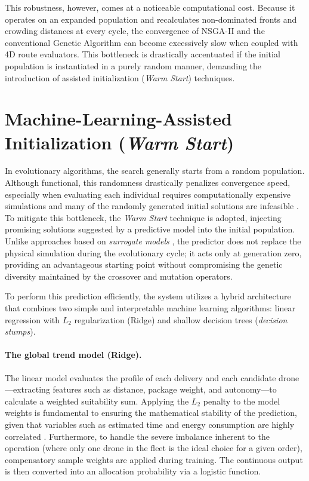 This robustness, however, comes at a noticeable computational cost. Because it operates on an expanded population and recalculates non-dominated fronts and crowding distances at every cycle, the convergence of NSGA-II and the conventional Genetic Algorithm can become excessively slow when coupled with 4D route evaluators. This bottleneck is drastically accentuated if the initial population is instantiated in a purely random manner, demanding the introduction of assisted initialization (\textit{Warm Start}) techniques.

\section{Machine-Learning-Assisted Initialization (\textit{Warm Start})}\label{sec:warmstart}

In evolutionary algorithms, the search generally starts from a random population. Although functional, this randomness drastically penalizes convergence speed, especially when evaluating each individual requires computationally expensive simulations and many of the randomly generated initial solutions are infeasible \cite{kazimipour2014}. To mitigate this bottleneck, the \textit{Warm Start} technique is adopted, injecting promising solutions suggested by a predictive model into the initial population. Unlike approaches based on \textit{surrogate models} \cite{jin2005,jin2011}, the predictor does not replace the physical simulation during the evolutionary cycle; it acts only at generation zero, providing an advantageous starting point without compromising the genetic diversity maintained by the crossover and mutation operators.

To perform this prediction efficiently, the system utilizes a hybrid architecture that combines two simple and interpretable machine learning algorithms: linear regression with $L_2$ regularization (Ridge) and shallow decision trees (\textit{decision stumps}).

\paragraph{The global trend model (Ridge).} 
The linear model evaluates the profile of each delivery and each candidate drone—extracting features such as distance, package weight, and autonomy—to calculate a weighted suitability sum. Applying the $L_2$ penalty to the model weights is fundamental to ensuring the mathematical stability of the prediction, given that variables such as estimated time and energy consumption are highly correlated \cite{hoerl1970}. Furthermore, to handle the severe imbalance inherent to the operation (where only one drone in the fleet is the ideal choice for a given order), compensatory sample weights are applied during training. The continuous output is then converted into an allocation probability via a logistic function.

